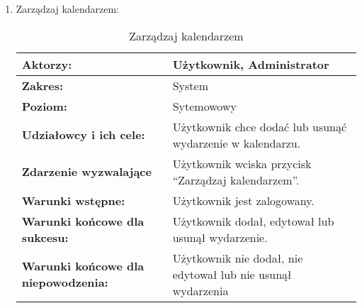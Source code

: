 \begin{enumerate}[label=(\Roman*)]
	\item Zarządzaj kalendarzem:
	\begin{table}[H]
\centering
\caption{Zarządzaj kalendarzem}
\label{zarzadzajkalendarzem}
\begin{tabular}{|p{7cm}|p{7cm}|}
  \hline 
  \textbf{Aktorzy:} & Użytkownik, Administrator\\
  \hline
  \textbf{Zakres:} & System \\
	\hline
  \textbf{Poziom:} & Sytemowowy \\
	\hline
  \textbf{Udziałowcy i ich cele: } & Użytkownik chce dodać lub usunąć wydarzenie w kalendarzu. \\
	\hline
  \textbf{Zdarzenie wyzwalające } & Użytkownik wciska przycisk “Zarządzaj kalendarzem”. \\
	\hline
  \textbf{Warunki wstępne: } & Użytkownik jest zalogowany.
 \\
	\hline
  \textbf{Warunki końcowe dla sukcesu:} & Użytkownik dodał, edytował lub usunął wydarzenie.
 \\
	\hline
  \textbf{Warunki końcowe dla niepowodzenia:} & Użytkownik nie dodał, nie edytował lub nie usunął wydarzenia \\
  \hline
\end{tabular} 
\end{table}


\end{enumerate}
